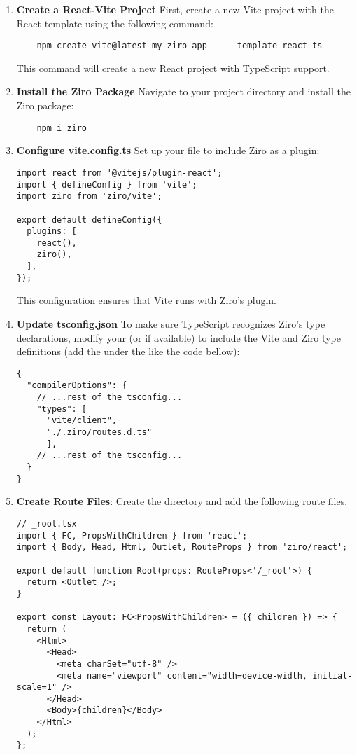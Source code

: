 \begin{enumerate}
  \item \textbf{Create a React-Vite Project} First, create a new Vite project with the React template using the following command:
  \begin{verbatim}
    npm create vite@latest my-ziro-app -- --template react-ts
  \end{verbatim}
  This command will create a new React project with TypeScript support.

  \item \textbf{Install the Ziro Package} Navigate to your project directory and install the Ziro package:
  \begin{verbatim}
    npm i ziro
  \end{verbatim}
  \item \textbf{Configure vite.config.ts} Set up your  file to include Ziro as a plugin:
  \begin{verbatim}
import react from '@vitejs/plugin-react';
import { defineConfig } from 'vite';
import ziro from 'ziro/vite';

export default defineConfig({
  plugins: [
    react(),
    ziro(),
  ],
});
\end{verbatim}
This configuration ensures that Vite runs with Ziro’s plugin.

\item \textbf{Update tsconfig.json} To make sure TypeScript recognizes Ziro's type declarations, modify your  (or  if available) to include the Vite and Ziro type definitions (add the  under the  like the code bellow):
\begin{verbatim}
{
  "compilerOptions": {
    // ...rest of the tsconfig...
    "types": [
      "vite/client",
      "./.ziro/routes.d.ts"
      ],
    // ...rest of the tsconfig...
  }
}
\end{verbatim}

\item \textbf{Create Route Files}: Create the  directory and add the following route files.
  \begin{verbatim}
// _root.tsx
import { FC, PropsWithChildren } from 'react';
import { Body, Head, Html, Outlet, RouteProps } from 'ziro/react';

export default function Root(props: RouteProps<'/_root'>) {
  return <Outlet />;
}

export const Layout: FC<PropsWithChildren> = ({ children }) => {
  return (
    <Html>
      <Head>
        <meta charSet="utf-8" />
        <meta name="viewport" content="width=device-width, initial-scale=1" />
      </Head>
      <Body>{children}</Body>
    </Html>
  );
};
  \end{verbatim}


\end{enumerate}
